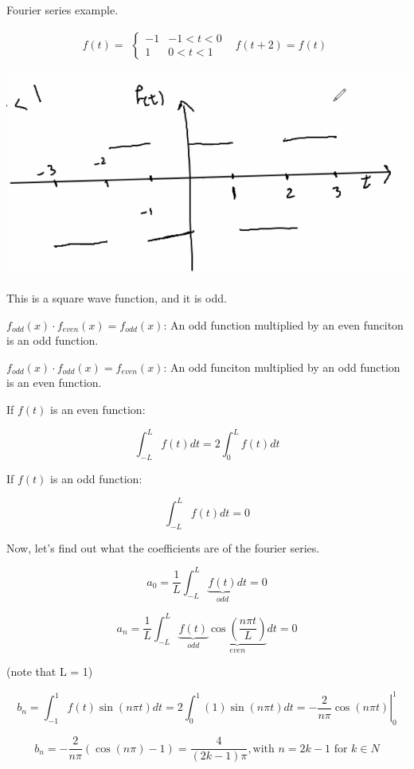 Fourier series example. 

$$f(t) = \begin{matrix} \left\{ \begin{matrix} -1 & -1 < t < 0 \\ 1 & 0 < t < 1 \end{matrix} \right. & f(t+2) = f(t) \end{matrix}$$

\includegraphics[width = 0.95 \textwidth]{image1.png}

This is a square wave function, and it is odd. 

$f_{odd}(x) \cdot f_{even} (x) = f_{odd} (x)$: An odd function multiplied by an even funciton is an odd function. 

$f_{odd} (x) \cdot f_{odd} (x) = f_{even} (x)$: An odd funciton multiplied by an odd function is an even function. 


If $f(t)$ is an even function:

$$\int_{-L}^L f(t) dt = 2 \int_0^L f(t) dt$$

If $f(t)$ is an odd function:

$$\int_{-L}^L f(t) dt = 0$$

Now, let's find out what the coefficients are of the fourier series. 

$$a_0 = \frac{1}{L} \int_{-L}^L \underbrace{f(t)}_{odd} dt = 0$$

$$a_n = \frac{1}{L} \int_{-L}^L \underbrace{f(t)}_{odd} \underbrace{\cos(\frac{n \pi t}{L})}_{even} dt = 0$$

(note that L = 1)

$$b_n = \int_{-1}^1 f(t) \sin(n \pi t) dt = 2 \int_{0}^{1} (1) \sin(n \pi t) dt = \left. - \frac{2}{n \pi} \cos(n \pi t) \right|_{0}^{1}$$

$$b_n = - \frac{2}{n \pi} \left( \cos(n \pi) - 1 \right) = \frac{4}{(2k - 1) \pi}, \text{with } n = 2k-1 \text{ for } k \in N$$

